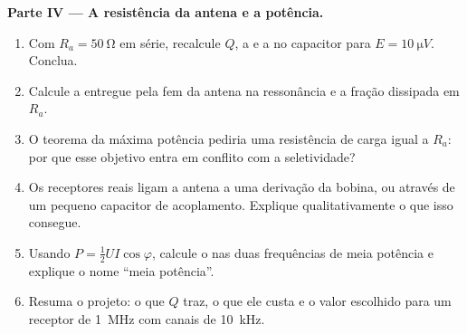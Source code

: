 \begin{problem}
\medskip
\noindent\textbf{Parte IV --- A resistência da antena e a potência.}
\begin{enumerate}[resume]
  \item Com $R_a = \qty{50}{\ohm}$ em série, recalcule $Q$, a
         e a  no capacitor para $E = \qty{10}{\micro V}$.
        Conclua.
  \item Calcule a  entregue pela fem da antena na
        ressonância e a fração dissipada em $R_a$.
  \item O teorema da máxima potência pediria uma resistência de carga igual
        a $R_a$: por que esse objetivo entra em conflito com a seletividade?
  \item Os receptores reais ligam a antena a uma derivação da bobina, ou
        através de um pequeno capacitor de acoplamento. Explique qualitativamente o que
        isso consegue.
  \item Usando $P = \tfrac12 UI\cos\varphi$, calcule o  nas
        duas frequências de meia potência e explique o nome
        ``meia potência''.
  \item Resuma o projeto: o que $Q$ traz, o que ele custa e o
        valor escolhido para um receptor de \qty{1}{MHz} com canais de \qty{10}{kHz}.
\end{enumerate}
\end{problem}
